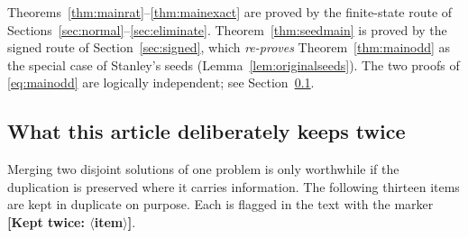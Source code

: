 \documentclass[11pt,letterpaper]{article}
\numberwithin{equation}{section}
\theoremstyle{definition}
\theoremstyle{remark}
\begin{document}
Theorems~\ref{thm:mainrat}--\ref{thm:mainexact} are proved by the
finite-state route of Sections~\ref{sec:normal}--\ref{sec:eliminate}.
Theorem~\ref{thm:seedmain} is proved by the signed route of
Section~\ref{sec:signed}, which \emph{re-proves} Theorem~\ref{thm:mainodd}
as the special case of Stanley's seeds (Lemma~\ref{lem:originalseeds}).
The two proofs of \eqref{eq:mainodd} are logically independent; see
Section~\ref{sec:twice}.

\subsection{What this article deliberately keeps twice}
\label{sec:twice}

Merging two disjoint solutions of one problem is only worthwhile if the
duplication is preserved where it carries information. The following
thirteen items are kept in duplicate on purpose. Each is flagged in the
text with the marker \textbf{[Kept twice: $\langle$item$\rangle$]}.
\end{document}
